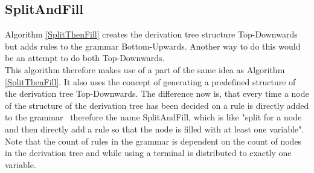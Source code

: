 \noindent
{}
\pagebreak

\subsection{SplitAndFill}
Algorithm \ref{SplitThenFill} creates the derivation tree structure Top-Downwards but adds rules to the grammar Bottom-Upwards. Another way to do this would be an attempt to do both Top-Downwards.\\
This algorithm therefore makes use of a part of the same idea as Algorithm \ref{SplitThenFill}. It also uses the concept of generating a predefined structure of the derivation tree Top-Downwards. The difference now is, that every time a node of the structure of the derivation tree has been decided on a rule is directly added to the grammar \textendash~therefore the name SplitAndFill, which is like "split for a node and then directly add a rule so that the node is filled with at least one variable". \\
Note that the count of rules in the grammar is dependent on the count of nodes in the derivation tree and while using  a terminal is distributed to exactly one variable.\\

\noindent
{}\\

